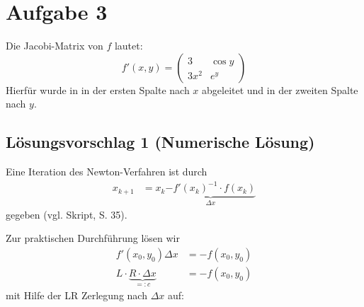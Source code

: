 \section*{Aufgabe 3}
Die Jacobi-Matrix von $f$ lautet:
\[f' (x,y) = \begin{pmatrix}
	3     & \cos y\\
	3 x^2 & e^y
\end{pmatrix}\]
Hierfür wurde in in der ersten Spalte nach $x$ abgeleitet und in der
zweiten Spalte nach $y$.

\subsection*{Lösungsvorschlag 1 (Numerische Lösung)}
Eine Iteration des Newton-Verfahren ist durch
\begin{align}
x_{k+1}&=x_{k}\underbrace{-f'(x_k)^{-1}\cdot f(x_k)}_{\Delta x}
\end{align}
gegeben (vgl. Skript, S. 35).

Zur praktischen Durchführung lösen wir
\begin{align}
    f'(x_0, y_0)\Delta x &= -f(x_0,y_0)\\
    L \cdot \underbrace{R \cdot \Delta x}_{=: c} &= -f(x_0, y_0)
\end{align}
mit Hilfe der LR Zerlegung nach $\Delta x$ auf:


